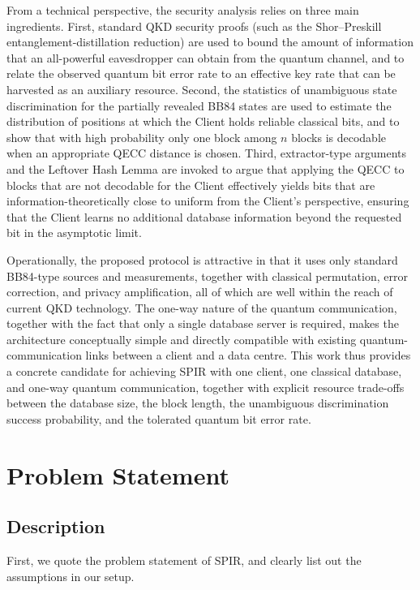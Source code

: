 \documentclass[%
 reprint,
superscriptaddress,
 amsmath,amssymb,
 aps,
]{revtex4-2}
\begin{document}
From a technical perspective, the security analysis relies on three main ingredients.%
First, standard QKD security proofs (such as the Shor–Preskill entanglement-distillation reduction) are used to bound the amount of information that an all-powerful eavesdropper can obtain from the quantum channel, and to relate the observed quantum bit error rate to an effective key rate that can be harvested as an auxiliary resource.%
Second, the statistics of unambiguous state discrimination for the partially revealed BB84 states are used to estimate the distribution of positions at which the Client holds reliable classical bits, and to show that with high probability only one block among $n$ blocks is decodable when an appropriate QECC distance is chosen.%
Third, extractor-type arguments and the Leftover Hash Lemma are invoked to argue that applying the QECC to blocks that are not decodable for the Client effectively yields bits that are information-theoretically close to uniform from the Client’s perspective, ensuring that the Client learns no additional database information beyond the requested bit in the asymptotic limit.%

Operationally, the proposed protocol is attractive in that it uses only standard BB84-type sources and measurements, together with classical permutation, error correction, and privacy amplification, all of which are well within the reach of current QKD technology.%
The one-way nature of the quantum communication, together with the fact that only a single database server is required, makes the architecture conceptually simple and directly compatible with existing quantum-communication links between a client and a data centre.%
This work thus provides a concrete candidate for achieving SPIR with one client, one classical database, and one-way quantum communication, together with explicit resource trade-offs between the database size, the block length, the unambiguous discrimination success probability, and the tolerated quantum bit error rate.%


\section{Problem Statement}
\subsection{Description}

First, we quote the problem statement of SPIR, and clearly list out the assumptions in our setup.
\end{document}
